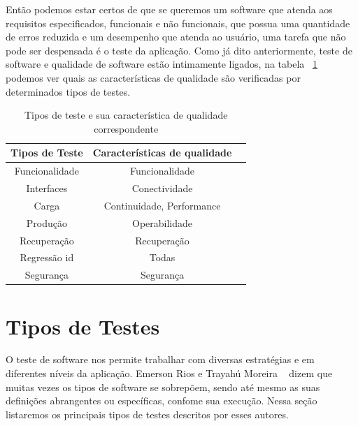 Então podemos estar certos de que se queremos um software que atenda aos requisitos especificados, funcionais e não funcionais, que possua uma quantidade de erros reduzida e um desempenho que atenda ao usuário, uma tarefa que não pode ser despensada é o teste da aplicação. Como já dito anteriormente, teste de software e qualidade de software estão intimamente ligados, na tabela ~\ref{tab:testequalidade} podemos ver quais as características de qualidade são verificadas por determinados tipos de testes.

\begin{table}
	\caption{Tipos de teste e sua característica de qualidade correspondente}
	\begin{center}
	\begin{tabular}{ccc}
		\hline
			\textbf{Tipos de Teste} & \textbf{Características de qualidade} \\
		\hline
			Funcionalidade & Funcionalidade \\
			Interfaces & Conectividade \\
			Carga & Continuidade, Performance \\
			Produção & Operabilidade \\
			Recuperação & Recuperação \\
			Regressão id & Todas \\
			Segurança & Segurança \\
		\hline
	\end {tabular}
	\end{center}
	\label{tab:testequalidade}
\end{table}

\section{Tipos de Testes}



O teste de software nos permite trabalhar com diversas estratégias e em diferentes níveis da aplicação. Emerson Rios e Trayahú Moreira ~\cite{rios2006teste} dizem que muitas vezes os tipos de software se sobrepõem, sendo até mesmo as suas definições abrangentes ou específicas, confome sua execução. Nessa seção listaremos os principais tipos de testes descritos por esses autores.

